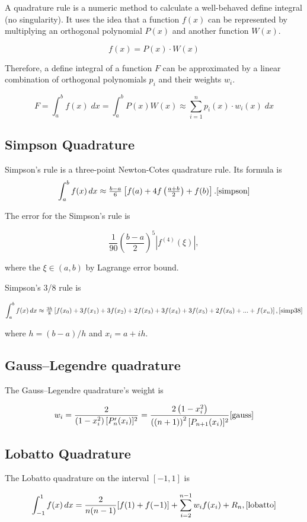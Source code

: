 \documentclass[a4paper,12pt,onecolumn]{article}
\begin{document}
A quadrature rule is a numeric method to calculate a well-behaved define integral (no singularity).
It uses the idea that a function $f(x)$ can be represented by multiplying an orthogonal polynomial $P(x)$
and another function $W(x)$.

\[f(x) = P(x)\cdot W(x)\]

Therefore, a define integral of a function $F$ can be approximated by a linear combination of orthogonal
polynomials $p_i$ and their weights $w_i$.

\[F = \int_{a}^{b}f(x)\;dx = \int_{a}^{b}P(x)W(x) \approx \sum_{i=1}^{n}p_i(x)\cdot w_i(x)\;dx\]

\subsection{Simpson Quadrature}
Simpson's rule is a three-point Newton-Cotes quadrature rule. Its formula is
\[\int _{a}^{b}f(x)\,dx\approx {\tfrac {b-a}{6}}\left[f(a)+4f\left({\tfrac {a+b}{2}}\right)+f(b)\right].
\cite{simpson}\]

The error for the Simpson's rule is

\[{\frac{1}{90}}\left({\frac{b-a}{2}}\right)^{5}\left|f^{{(4)}}(\xi )\right|,\]

where the $\xi \in (a, b)$ by Lagrange error bound. \cite{simp}

Simpson's 3/8 rule is

\[\int _{a}^{b}f(x)\,dx\approx {\tfrac {3h}{8}}\left[f(x_{0})+3f(x_{1})+3f(x_{2})+
2f(x_{3})+3f(x_{4})+3f(x_{5})+2f(x_{6})+...+f(x_{n})\right], \cite{simp38}\]

where $h=(b-a)/h$ and $x_i = a+ih$.

\subsection{Gauss–Legendre quadrature}
The Gauss–Legendre quadrature's weight is

\[w_{i}={\frac {2}{\left(1-x_{i}^{2}\right)[P'_{n}(x_{i})]^{2}}}=
\frac{2\left(1-x_{i}^2\right)}{\left((n+1)\right)^2[P_{n+1}(x_{i})]^{2}} \cite{gauss}\]

\subsection{Lobatto Quadrature}
The Lobatto quadrature on the interval $[-1,1]$ is

\[\int _{-1}^{1}{f(x)\,dx} = \frac{2}{n(n-1)}[f(1)+f(-1)] + \sum _{i=2}^{n-1}{w_{i}f(x_{i})}+R_{n},
\cite{lobatto}\]
\end{document}
